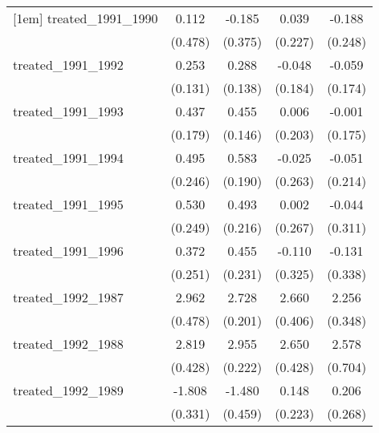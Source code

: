 {\begin{tabular}{l*{4}{c}}
[1em]
treated\_1991\_1990&       0.112         &      -0.185         &       0.039         &      -0.188         \\
            &     (0.478)         &     (0.375)         &     (0.227)         &     (0.248)         \\
[1em]
treated\_1991\_1992&       0.253         &       0.288\sym{*}  &      -0.048         &      -0.059         \\
            &     (0.131)         &     (0.138)         &     (0.184)         &     (0.174)         \\
[1em]
treated\_1991\_1993&       0.437\sym{*}  &       0.455\sym{**} &       0.006         &      -0.001         \\
            &     (0.179)         &     (0.146)         &     (0.203)         &     (0.175)         \\
[1em]
treated\_1991\_1994&       0.495\sym{*}  &       0.583\sym{**} &      -0.025         &      -0.051         \\
            &     (0.246)         &     (0.190)         &     (0.263)         &     (0.214)         \\
[1em]
treated\_1991\_1995&       0.530\sym{*}  &       0.493\sym{*}  &       0.002         &      -0.044         \\
            &     (0.249)         &     (0.216)         &     (0.267)         &     (0.311)         \\
[1em]
treated\_1991\_1996&       0.372         &       0.455\sym{*}  &      -0.110         &      -0.131         \\
            &     (0.251)         &     (0.231)         &     (0.325)         &     (0.338)         \\
[1em]
treated\_1992\_1987&       2.962\sym{***}&       2.728\sym{***}&       2.660\sym{***}&       2.256\sym{***}\\
            &     (0.478)         &     (0.201)         &     (0.406)         &     (0.348)         \\
[1em]
treated\_1992\_1988&       2.819\sym{***}&       2.955\sym{***}&       2.650\sym{***}&       2.578\sym{***}\\
            &     (0.428)         &     (0.222)         &     (0.428)         &     (0.704)         \\
[1em]
treated\_1992\_1989&      -1.808\sym{***}&      -1.480\sym{**} &       0.148         &       0.206         \\
            &     (0.331)         &     (0.459)         &     (0.223)         &     (0.268)         \\

\end{tabular}}
